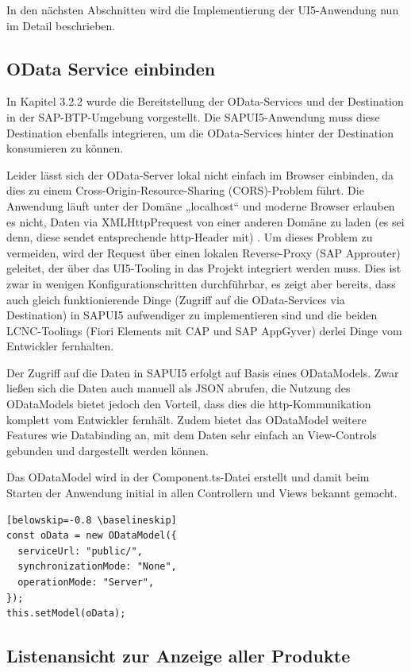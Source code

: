 In den nächsten Abschnitten wird die Implementierung der UI5-Anwendung nun im Detail beschrieben. 

\subsection{OData Service einbinden}

In Kapitel 3.2.2 wurde die Bereitstellung der OData-Services und der Destination in der SAP-BTP-Umgebung vorgestellt. Die SAPUI5-Anwendung muss diese Destination ebenfalls integrieren, um die OData-Services hinter der Destination konsumieren zu können. 

Leider lässt sich der OData-Server lokal nicht einfach im Browser einbinden, da dies zu einem Cross-Origin-Resource-Sharing (CORS)-Problem führt. Die Anwendung läuft unter der Domäne „localhost“ und moderne Browser erlauben es nicht, Daten via XMLHttpPrequest von einer anderen Domäne zu laden (es sei denn, diese sendet entsprechende http-Header mit) \cite{sud:s25}. Um dieses Problem zu vermeiden, wird der Request über einen lokalen Reverse-Proxy (SAP Approuter) geleitet, der über das UI5-Tooling in das Projekt integriert werden muss. Dies ist zwar in wenigen Konfigurationschritten durchführbar, es zeigt aber bereits, dass auch gleich funktionierende Dinge (Zugriff auf die OData-Services via Destination) in SAPUI5 aufwendiger zu implementieren sind und die beiden LCNC-Toolings (Fiori Elements mit CAP und SAP AppGyver) derlei Dinge vom Entwickler fernhalten.

Der Zugriff auf die Daten in SAPUI5 erfolgt auf Basis eines ODataModels. Zwar ließen sich die Daten auch manuell als JSON abrufen, die Nutzung des ODataModels bietet jedoch den Vorteil, dass dies die http-Kommunikation komplett vom Entwickler fernhält. Zudem bietet das ODataModel weitere Features wie Databinding an, mit dem Daten sehr einfach an View-Controls gebunden und dargestellt werden können. 

Das ODataModel wird in der Component.ts-Datei erstellt und damit beim Starten der Anwendung initial in allen Controllern und Views bekannt gemacht.

\begin{lstlisting}[emph={oData}][belowskip=-0.8 \baselineskip]
const oData = new ODataModel({
  serviceUrl: "public/",
  synchronizationMode: "None",
  operationMode: "Server",
});
this.setModel(oData);
\end{lstlisting}

\subsection{Listenansicht zur Anzeige aller Produkte}

